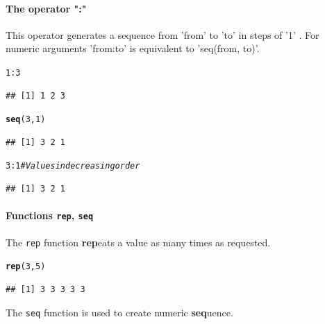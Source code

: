 \documentclass[10pt]{article}\usepackage[]{graphicx}\usepackage[]{color}
\makeatletter
\newcommand{\hlnum}[1]{\textcolor[rgb]{0.686,0.059,0.569}{#1}}%
\newcommand{\hlcom}[1]{\textcolor[rgb]{0.678,0.584,0.686}{\textit{#1}}}%
\newcommand{\hlopt}[1]{\textcolor[rgb]{0,0,0}{#1}}%
\newcommand{\hlstd}[1]{\textcolor[rgb]{0.345,0.345,0.345}{#1}}%
\newcommand{\hlkwd}[1]{\textcolor[rgb]{0.737,0.353,0.396}{\textbf{#1}}}%
\newenvironment{kframe}{%
 \def\at@end@of@kframe{}%
 \ifinner\ifhmode%
  \def\at@end@of@kframe{\end{minipage}}%
  \begin{minipage}{\columnwidth}%
 \fi\fi%
 \def\FrameCommand##1{\hskip\@totalleftmargin \hskip-\fboxsep
 \colorbox{shadecolor}{##1}\hskip-\fboxsep
     \hskip-\linewidth \hskip-\@totalleftmargin \hskip\columnwidth}%
 \MakeFramed {\advance\hsize-\width
   \@totalleftmargin\z@ \linewidth\hsize
   \@setminipage}}%
 {\par\unskip\endMakeFramed%
 \at@end@of@kframe}
\newenvironment{knitrout}{}{} %
\newcommand{\Rfunction}[1]{{\texttt{#1}}}
\makeatother
\begin{document}
\paragraph{The operator ":"}
This operator generates a sequence from 'from' to 'to' in steps of '1' .
For numeric arguments 'from:to' is equivalent to 'seq(from, to)'.

\begin{knitrout}
\color{fgcolor}\begin{kframe}
\begin{alltt}
\hlnum{1}\hlopt{:}\hlnum{3}
\end{alltt}
\begin{verbatim}
## [1] 1 2 3
\end{verbatim}
\begin{alltt}
\hlkwd{seq}\hlstd{(}\hlnum{3}\hlstd{,} \hlnum{1}\hlstd{)}
\end{alltt}
\begin{verbatim}
## [1] 3 2 1
\end{verbatim}
\begin{alltt}
\hlnum{3}\hlopt{:}\hlnum{1}                   \hlcom{# Values in decreasing order}
\end{alltt}
\begin{verbatim}
## [1] 3 2 1
\end{verbatim}
\end{kframe}
\end{knitrout}
\medskip
\paragraph{Functions \Rfunction{rep}, \Rfunction{seq}}
The \Rfunction{rep} function \textbf{rep}eats a value as many times as requested.
\begin{knitrout}
\color{fgcolor}\begin{kframe}
\begin{alltt}
\hlkwd{rep}\hlstd{(}\hlnum{3}\hlstd{,}\hlnum{5}\hlstd{)}
\end{alltt}
\begin{verbatim}
## [1] 3 3 3 3 3
\end{verbatim}
\end{kframe}
\end{knitrout}

The \Rfunction{seq} function is used to create numeric \textbf{seq}uence.
\end{document}
